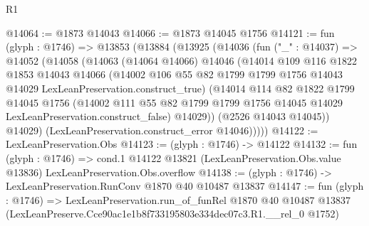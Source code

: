 \begin{lexlean}{R1}
\begin{coremodule}
@14064 := @1873 @14043
@14066 := @1873 @14045 @1756
@14121 := fun (glyph : @1746) =>
  @13853
    (@13884
      (@13925
        (@14036
          (fun ("_" : @14037) =>
          @14052
            (@14058
              (@14063
                (@14064 @14066)
                @14046
                (@14014
                  @109
                  @116
                  @1822
                  @1853
                  @14043
                  @14066
                  (@14002
                    @106
                    @55
                    @82
                    @1799
                    @1799
                    @1756
                    @14043
                    @14029
                    LexLeanPreservation.construct_true)
                  (@14014
                    @114
                    @82
                    @1822
                    @1799
                    @14045
                    @1756
                    (@14002
                      @111
                      @55
                      @82
                      @1799
                      @1799
                      @1756
                      @14045
                      @14029
                      LexLeanPreservation.construct_false)
                    @14029))
                (@2526 @14043 @14045))
              @14029)
            (LexLeanPreservation.construct_error @14046)))))
@14122 := LexLeanPreservation.Obs
@14123 := (glyph : @1746) -> @14122
@14132 := fun (glyph : @1746) =>
  cond.{1} @14122 @13821 (LexLeanPreservation.Obs.value @13836) LexLeanPreservation.Obs.overflow
@14138 := (glyph : @1746) -> LexLeanPreservation.RunConv @1870 @40 @10487 @13837
@14147 := fun (glyph : @1746) =>
  LexLeanPreservation.run_of_funRel
    @1870
    @40
    @10487
    @13837
    (LexLeanPreserve.Cce90ac1e1b8f733195803e334dec07c3.R1.__rel_0 @1752)
\end{coremodule}
\end{lexlean}

